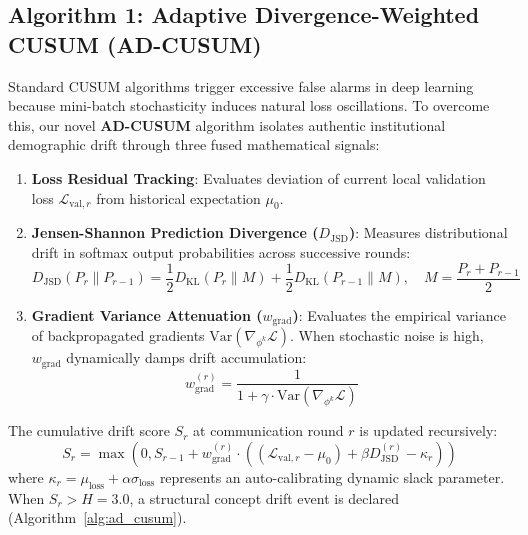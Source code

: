 \documentclass{llncs}
\begin{document}
\subsection{Algorithm 1: Adaptive Divergence-Weighted CUSUM (AD-CUSUM)}
Standard CUSUM algorithms trigger excessive false alarms in deep learning because mini-batch stochasticity induces natural loss oscillations. To overcome this, our novel \textbf{AD-CUSUM} algorithm isolates authentic institutional demographic drift through three fused mathematical signals:
\begin{enumerate}
    \item \textbf{Loss Residual Tracking}: Evaluates deviation of current local validation loss $\mathcal{L}_{\text{val}, r}$ from historical expectation $\mu_0$.
    \item \textbf{Jensen-Shannon Prediction Divergence ($D_{\text{JSD}}$)}: Measures distributional drift in softmax output probabilities across successive rounds:
    \begin{equation}
    D_{\text{JSD}}(P_r \parallel P_{r-1}) = \frac{1}{2} D_{\text{KL}}(P_r \parallel M) + \frac{1}{2} D_{\text{KL}}(P_{r-1} \parallel M), \quad M = \frac{P_r + P_{r-1}}{2}
    \end{equation}
    \item \textbf{Gradient Variance Attenuation ($w_{\text{grad}}$)}: Evaluates the empirical variance of backpropagated gradients $\text{Var}(\nabla_{\phi^k} \mathcal{L})$. When stochastic noise is high, $w_{\text{grad}}$ dynamically damps drift accumulation:
    \begin{equation}
    w_{\text{grad}}^{(r)} = \frac{1}{1 + \gamma \cdot \text{Var}(\nabla_{\phi^k} \mathcal{L})}
    \end{equation}
\end{enumerate}

The cumulative drift score $S_r$ at communication round $r$ is updated recursively:
\begin{equation}
S_r = \max\left(0, S_{r-1} + w_{\text{grad}}^{(r)} \cdot \left((\mathcal{L}_{\text{val}, r} - \mu_0) + \beta D_{\text{JSD}}^{(r)} - \kappa_r\right)\right)
\label{eq:ad_cusum}
\end{equation}
where $\kappa_r = \mu_{\text{loss}} + \alpha \sigma_{\text{loss}}$ represents an auto-calibrating dynamic slack parameter. When $S_r > H = 3.0$, a structural concept drift event is declared (Algorithm~\ref{alg:ad_cusum}).
\end{document}
